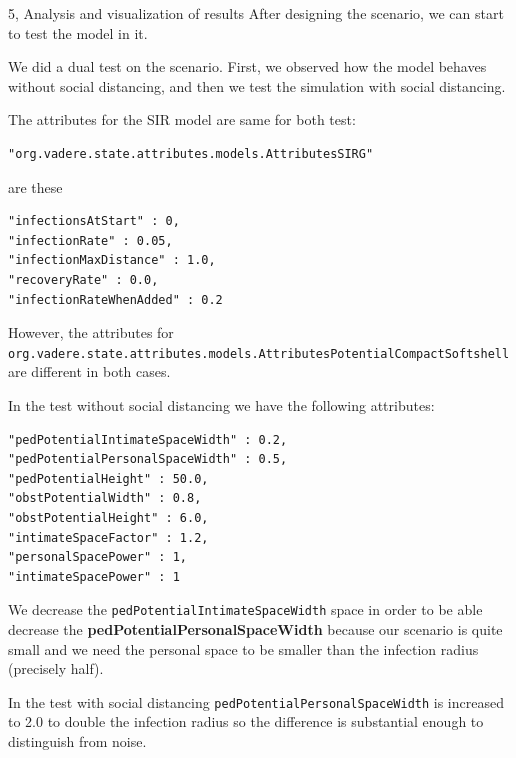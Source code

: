 \begin{task}{5, Analysis and visualization of results}
After designing the scenario, we can start to test the model in it. 

We did a dual test on the scenario. First, we observed how the model behaves without social distancing, and then we test the simulation with social distancing. 

The attributes for the SIR model are same for both test:
\begin{verbatim}
"org.vadere.state.attributes.models.AttributesSIRG"
\end{verbatim}
are these
\begin{verbatim}
"infectionsAtStart" : 0,
"infectionRate" : 0.05,
"infectionMaxDistance" : 1.0,
"recoveryRate" : 0.0,
"infectionRateWhenAdded" : 0.2
\end{verbatim}


However, the attributes for \verb+org.vadere.state.attributes.models.AttributesPotentialCompactSoftshell+
are different in both cases. 

In the test without social distancing we have the following attributes:
\begin{verbatim}
"pedPotentialIntimateSpaceWidth" : 0.2,
"pedPotentialPersonalSpaceWidth" : 0.5,
"pedPotentialHeight" : 50.0,
"obstPotentialWidth" : 0.8,
"obstPotentialHeight" : 6.0,
"intimateSpaceFactor" : 1.2,
"personalSpacePower" : 1,
"intimateSpacePower" : 1
\end{verbatim}

We decrease the \verb+pedPotentialIntimateSpaceWidth+ space in order to be able decrease the \textbf{pedPotentialPersonalSpaceWidth} because our scenario is quite small and we need the personal space to be smaller than the infection radius (precisely half).

In the test with social distancing \verb+pedPotentialPersonalSpaceWidth+ is increased to 2.0 to double the infection radius so the difference is substantial enough to distinguish from noise.


\end{task}
